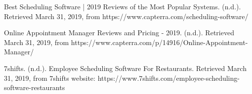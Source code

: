 \documentclass[sigconf]{acmart}
\begin{document}



% 
\begin{thebibliography}{1}

Best Scheduling Software | 2019 Reviews of the Most Popular Systems. (n.d.). Retrieved March 31, 2019, from https://www.capterra.com/scheduling-software/

Online Appointment Manager Reviews and Pricing - 2019. (n.d.). Retrieved March 31, 2019, from https://www.capterra.com/p/14916/Online-Appointment-Manager/

7shifts. (n.d.). Employee Scheduling Software For Restaurants. Retrieved March 31, 2019, from 7shifts website: https://www.7shifts.com/employee-scheduling-software-restaurants

\end{thebibliography}
\end{document}
